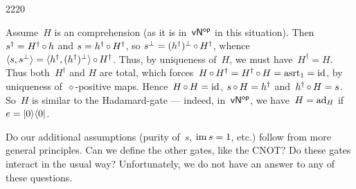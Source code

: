 \begin{parsec}{2220}
\begin{point}{10}
\begin{point}{30}
Assume~$H$ is an comprehension (as it is in~${\mathsf{vN}}{^{\mathsf{op}}}$ in this situation).
    Then~$s^\dagger = H^\dagger \mathop{\circ} h$ and
        $s = h^\dagger \mathop{\circ} H^\dagger$,
        so $s^\perp = (h^\dagger)^\perp \mathop{\circ} H^\dagger$,
        whence~$\langle s,s^\perp \rangle = \langle
                h^\dagger, (h^\dagger)^\perp \rangle \mathop{\circ} H^\dagger$.
Thus, by uniqueness of~$H$, we must have~$H^\dagger = H$.
Thus both~$H^\dagger$ and $H$ are total,
    which forces~$H\mathop{\circ} H^\dagger = H^\dagger \mathop{\circ} H = \mathrm{asrt}_{1} = \operatorname{id}$,
    by uniqueness of~$\diamond$-positive maps.
Hence~$H \mathop{\circ} H = \operatorname{id}$,
    $s \mathop{\circ} H = h^\dagger$
    and~$h^\dagger \mathop{\circ} H = s$.
    So~$H$ is similar to the Hadamard-gate
        --- indeed, in~${\mathsf{vN}}{^{\mathsf{op}}}$, we have~$H = \mathrm{ad}_H$ if~$e = \left|0\right>\!\left<0\right|$.
\end{point}
\begin{point}{40}%
Do our additional assumptions (purity of~$s$, $\operatorname{im} s = 1$, etc.)
follow from more general principles.  Can we define the other gates, like
    the CNOT? Do these gates interact in the usual way?
    Unfortunately, we do not have an answer to any of these questions.
\end{point}
\end{point}
\end{parsec}


